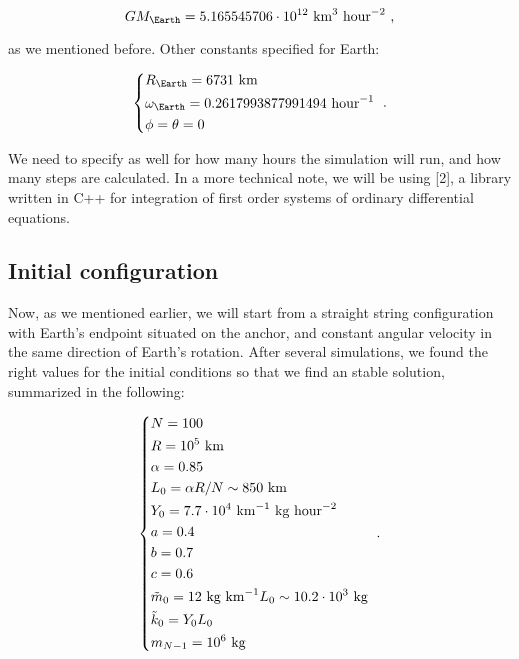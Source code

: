 \documentclass[8 pt, twocolumn]{article}
\begin{document}
\begin{equation}
  GM_{\Earth} = 5.165545706 \cdot 10^{12} \text{ km}^3 \text{ hour}^{-2}  \text{ ,}
\end{equation}

as we mentioned before. Other constants specified for Earth:

\begin{equation}
  \begin{dcases*}
    R_\Earth = 6731 \text{ km} \\
    \omega_\Earth = 0.2617993877991494 \text{ hour}^{-1} \\
    \phi = \theta = 0
  \end{dcases*} \text{ .}
\end{equation}

We need to specify as well for how many hours the simulation will run, and how many steps are calculated. In a more technical note, we will be using [2], a library written in C++ for integration of first order systems of ordinary differential equations.

\subsection{Initial configuration}

Now, as we mentioned earlier, we will start from a straight string configuration with Earth's endpoint situated on the anchor, and constant angular velocity in the same direction of Earth's rotation. After several simulations, we found the right values for the initial conditions so that we find an stable solution, summarized in the following:

\begin{equation}
  \begin{dcases*}
    N = 100 \\
    R = 10^5 \text{ km} \\
    \alpha = 0.85 \\
    L_0 = \alpha R/N \sim 850 \text{ km} \\
    Y_0 = 7.7 \cdot 10^{4} \text{ km}^{-1} \text{ kg hour}^{-2} \\
    a = 0.4 \\
    b = 0.7 \\
    c = 0.6 \\
    \tilde m_0 = 12 \text{ kg km}^{-1} L_0 \sim 10.2 \cdot 10^3 \text{ kg} \\
    \tilde k_0 = Y_0 L_0 \\
    m_{N-1} = 10^6 \text{ kg} \\
  \end{dcases*}
  \text{ .}
\end{equation}
\end{document}
